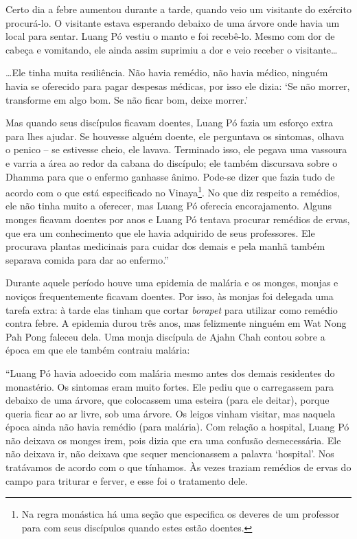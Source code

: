 Certo dia a febre aumentou durante a tarde, quando veio um visitante do
exército procurá-lo. O visitante estava esperando debaixo de uma árvore
onde havia um local para sentar. Luang Pó vestiu o manto e foi
recebê-lo. Mesmo com dor de cabeça e vomitando, ele ainda assim suprimiu
a dor e veio receber o visitante\ldots{}

\ldots{}Ele tinha muita resiliência. Não havia remédio, não havia
médico, ninguém havia se oferecido para pagar despesas médicas, por isso
ele dizia: `Se não morrer, transforme em algo bom. Se não ficar bom,
deixe morrer.'

Mas quando seus discípulos ficavam doentes, Luang Pó fazia um esforço
extra para lhes ajudar. Se houvesse alguém doente, ele perguntava os
sintomas, olhava o penico -- se estivesse cheio, ele lavava. Terminado
isso, ele pegava uma vassoura e varria a área ao redor da cabana do
discípulo; ele também discursava sobre o Dhamma para que o enfermo
ganhasse ânimo. Pode-se dizer que fazia tudo de acordo com o que está
especificado no Vinaya\footnote{Na regra monástica há uma seção que
  especifica os deveres de um professor para com seus discípulos quando
  estes estão doentes.}. No que diz respeito a remédios, ele não tinha
muito a oferecer, mas Luang Pó oferecia encorajamento. Alguns monges
ficavam doentes por anos e Luang Pó tentava procurar remédios de ervas,
que era um conhecimento que ele havia adquirido de seus professores. Ele
procurava plantas medicinais para cuidar dos demais e pela manhã também
separava comida para dar ao enfermo.''

Durante aquele período houve uma epidemia de malária e os monges, monjas
e noviços frequentemente ficavam doentes. Por isso, às monjas foi
delegada uma tarefa extra: à tarde elas tinham que cortar \emph{borapet}
para utilizar como remédio contra febre. A epidemia durou três anos, mas
felizmente ninguém em Wat Nong Pah Pong faleceu dela. Uma monja
discípula de Ajahn Chah contou sobre a época em que ele também contraiu
malária:

``Luang Pó havia adoecido com malária mesmo antes dos demais residentes
do monastério. Os sintomas eram muito fortes. Ele pediu que o
carregassem para debaixo de uma árvore, que colocassem uma esteira (para
ele deitar), porque queria ficar ao ar livre, sob uma árvore. Os leigos
vinham visitar, mas naquela época ainda não havia remédio (para
malária). Com relação a hospital, Luang Pó não deixava os monges irem,
pois dizia que era uma confusão desnecessária. Ele não deixava ir, não
deixava que sequer mencionassem a palavra `hospital'. Nos tratávamos de
acordo com o que tínhamos. Às vezes traziam remédios de ervas do campo
para triturar e ferver, e esse foi o tratamento dele.

